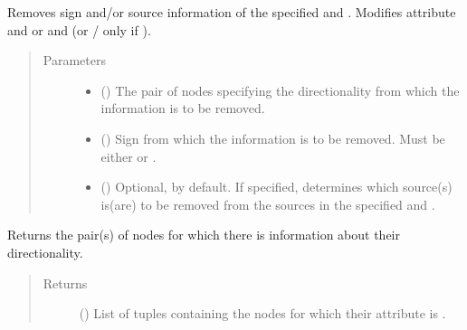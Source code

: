 \documentclass[letterpaper,10pt,english]{sphinxmanual}
\begin{document}
\begin{fulllineitems}
\begin{fulllineitems}
\label{\detokenize{reference:pypath.main.Direction.unset_sign}}
Removes sign and/or source information of the specified
 and . Modifies attribute 
and  or  and
 (or
/
only if ).
\begin{quote}\begin{description}
\item[{Parameters}] \leavevmode\begin{itemize}
\item {} 
 () \textendash{} The pair of nodes specifying the directionality from which
the information is to be removed.

\item {} 
 () \textendash{} Sign from which the information is to be removed. Must be
either  or .

\item {} 
 () \textendash{} Optional,  by default. If specified, determines
which source(s) is(are) to be removed from the sources in
the specified  and .

\end{itemize}

\end{description}\end{quote}

\end{fulllineitems}


\begin{fulllineitems}
\label{\detokenize{reference:pypath.main.Direction.which_dirs}}
Returns the pair(s) of nodes for which there is information
about their directionality.
\begin{quote}\begin{description}
\item[{Returns}] \leavevmode
() \textendash{} List of tuples containing the nodes for which
their attribute  is .


\end{description}
\end{quote}
\end{fulllineitems}
\end{fulllineitems}
\end{document}
